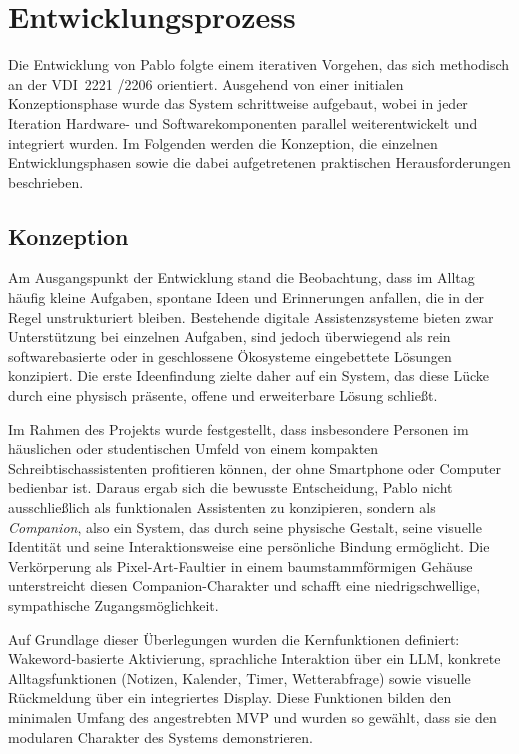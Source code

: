 \section{Entwicklungsprozess}

Die Entwicklung von Pablo folgte einem iterativen Vorgehen, das sich methodisch an der VDI~2221
/2206 orientiert.
Ausgehend von einer initialen Konzeptionsphase wurde das System schrittweise aufgebaut, wobei in jeder Iteration Hardware- und Softwarekomponenten parallel weiterentwickelt und integriert wurden.
Im Folgenden werden die Konzeption, die einzelnen Entwicklungsphasen sowie die dabei aufgetretenen praktischen Herausforderungen beschrieben.


\subsection{Konzeption}

Am Ausgangspunkt der Entwicklung stand die Beobachtung, dass im Alltag häufig kleine Aufgaben, spontane Ideen und Erinnerungen anfallen, die in der Regel unstrukturiert bleiben.
Bestehende digitale Assistenzsysteme bieten zwar Unterstützung bei einzelnen Aufgaben, sind jedoch überwiegend als rein softwarebasierte oder in geschlossene Ökosysteme eingebettete Lösungen konzipiert.
Die erste Ideenfindung zielte daher auf ein System, das diese Lücke durch eine physisch präsente, offene und erweiterbare Lösung schließt.

Im Rahmen des Projekts wurde festgestellt, dass insbesondere Personen im häuslichen oder studentischen Umfeld von einem kompakten Schreibtischassistenten profitieren können, der ohne Smartphone oder Computer bedienbar ist.
Daraus ergab sich die bewusste Entscheidung, Pablo nicht ausschließlich als funktionalen Assistenten zu konzipieren, sondern als \textit{Companion}, also ein System, das durch seine physische Gestalt, seine visuelle Identität und seine Interaktionsweise eine persönliche Bindung ermöglicht.
Die Verkörperung als Pixel-Art-Faultier in einem baumstammförmigen Gehäuse unterstreicht diesen Companion-Charakter und schafft eine niedrigschwellige, sympathische Zugangsmöglichkeit.

Auf Grundlage dieser Überlegungen wurden die Kernfunktionen definiert: Wakeword-basierte Aktivierung, sprachliche Interaktion über ein LLM, konkrete Alltagsfunktionen (Notizen, Kalender, Timer, Wetterabfrage) sowie visuelle Rückmeldung über ein integriertes Display.
Diese Funktionen bilden den minimalen Umfang des angestrebten MVP und wurden so gewählt, dass sie den modularen Charakter des Systems demonstrieren.


